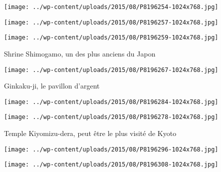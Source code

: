  

\begin{center} \texttt{[image: ../wp-content/uploads/2015/08/P8196254-1024x768.jpg]} \end{center}

 

 

\begin{center} \texttt{[image: ../wp-content/uploads/2015/08/P8196257-1024x768.jpg]} \end{center}

 

 

\begin{center} \texttt{[image: ../wp-content/uploads/2015/08/P8196259-1024x768.jpg]} \end{center}

 

 Shrine Shimogamo, un des plus anciens du Japon 

 

\begin{center} \texttt{[image: ../wp-content/uploads/2015/08/P8196267-1024x768.jpg]} \end{center}

 

 Ginkaku-ji, le pavillon d'argent 

 

\begin{center} \texttt{[image: ../wp-content/uploads/2015/08/P8196284-1024x768.jpg]} \end{center}

 

 

\begin{center} \texttt{[image: ../wp-content/uploads/2015/08/P8196278-1024x768.jpg]} \end{center}

 

 Temple Kiyomizu-dera, peut être le plus visité de Kyoto 

 

\begin{center} \texttt{[image: ../wp-content/uploads/2015/08/P8196296-1024x768.jpg]} \end{center}

 

 

\begin{center} \texttt{[image: ../wp-content/uploads/2015/08/P8196308-1024x768.jpg]} \end{center}

